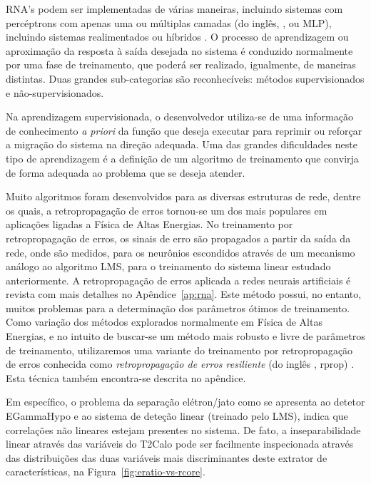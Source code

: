 RNA's podem ser implementadas de várias maneiras, incluindo sistemas com
percéptrons com apenas uma ou múltiplas camadas (do inglês, , ou MLP), incluindo sistemas realimentados ou híbridos
\cite{haykin}. O processo de aprendizagem ou aproximação da resposta à saída
desejada no sistema é conduzido normalmente por uma fase de treinamento, que
poderá ser realizado, igualmente, de maneiras distintas. Duas grandes
sub-categorias são reconhecíveis: métodos supervisionados e
não-supervisionados.

Na aprendizagem supervisionada, o desenvolvedor utiliza-se de uma informação
de conhecimento \textit{a priori} da função que deseja executar para reprimir
ou reforçar a migração do sistema na direção adequada. Uma das grandes
dificuldades neste tipo de aprendizagem é a definição de um algoritmo de
treinamento que convirja de forma adequada ao problema que se deseja atender.

Muito algoritmos foram desenvolvidos para as diversas estruturas de rede,
dentre os quais, a retropropagação de erros tornou-se um dos mais populares em
aplicações ligadas a Física de Altas Energias. No treinamento por
retropropagação de erros, os sinais de erro são propagados a partir da saída
da rede, onde são medidos, para os neurônios escondidos através de um
mecanismo análogo ao algoritmo LMS, para o treinamento do sistema linear
estudado anteriormente. A retropropagação de erros aplicada a redes neurais
artificiais é revista com mais detalhes no Apêndice~\ref{ap:rna}. Este método
possui, no entanto, muitos problemas para a determinação dos parâmetros ótimos
de treinamento. Como variação dos métodos explorados normalmente em Física de
Altas Energias, e no intuito de buscar-se um método mais robusto e livre de
parâmetros de treinamento, utilizaremos uma variante do treinamento por
retropropagação de erros conhecida como \textit{retropropagação de erros
resiliente} (do inglês , rprop)
\cite{rprop}. Esta técnica também encontra-se descrita no apêndice.

Em específico, o problema da separação elétron/jato como se apresenta ao
detetor EGammaHypo e ao sistema de deteção linear (treinado pelo LMS), indica
que correlações não lineares estejam presentes no sistema. De fato, a
inseparabilidade linear através das variáveis do T2Calo pode ser facilmente
inspecionada através das distribuições das duas variáveis mais discriminantes
deste extrator de características, na Figura~\ref{fig:eratio-vs-rcore}.

